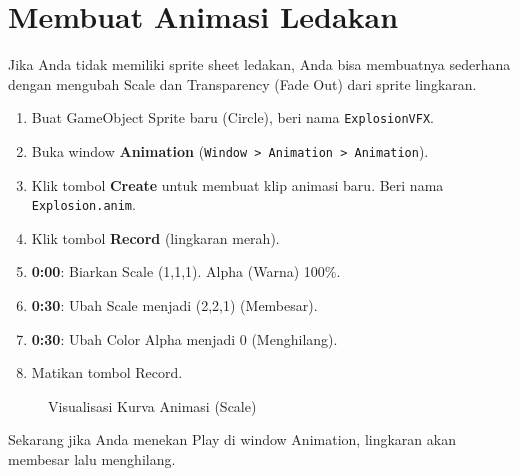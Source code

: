 
\section{Membuat Animasi Ledakan}

Jika Anda tidak memiliki sprite sheet ledakan, Anda bisa membuatnya sederhana dengan mengubah Scale dan Transparency (Fade Out) dari sprite lingkaran.

\begin{enumerate}
    \item Buat GameObject Sprite baru (Circle), beri nama \texttt{ExplosionVFX}.
    \item Buka window \textbf{Animation} (\texttt{Window > Animation > Animation}).
    \item Klik tombol \textbf{Create} untuk membuat klip animasi baru. Beri nama \texttt{Explosion.anim}.
    \item Klik tombol \textbf{Record} (lingkaran merah).
    \item \textbf{0:00}: Biarkan Scale (1,1,1). Alpha (Warna) 100\%.
    \item \textbf{0:30}: Ubah Scale menjadi (2,2,1) (Membesar).
    \item \textbf{0:30}: Ubah Color Alpha menjadi 0 (Menghilang).
    \item Matikan tombol Record.
\end{enumerate}

\begin{figure}[ht]
    \centering
    \caption{Visualisasi Kurva Animasi (Scale)}
    \label{fig:anim_curve}
\end{figure}

Sekarang jika Anda menekan Play di window Animation, lingkaran akan membesar lalu menghilang.
